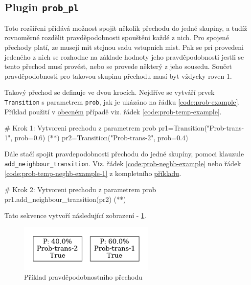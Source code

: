 \subsection{Plugin \texttt{prob\_pl}}
\label{subsec:prob_pl}
Toto rozšířeni přidává možnost spojit několik přechodu do jedné skupiny, a tudíž rovnoměrné rozdělit pravděpodobnosti spouštěni každé z nich. Pro spojené přechody platí, ze musejí mit stejnou sadu vstupních mist. Pak se pri provedeni jedeného z nich se rozhodne na základe hodnoty jeho pravděpodobnosti jestli se tento přechod musí provést, nebo se provede některý z jeho sousedu. Součet pravděpodobnosti pro takovou skupinu přechodu musí byt vždycky roven 1.

Takový přechod se definuje ve dvou krocích. Nejdříve se vytváří prvek \texttt{Transition} s parametrem \texttt{prob}, jak je ukázáno na řádku \ref{code:prob-example}. Příklad použití v \hyperref[code:prob-ev-draw]{obecném} případě viz. řádek \ref{code:prob-temp-example}.
\begin{python}
  # Krok 1: Vytvoreni prechodu z parametrem prob
  pr1=Transition("Prob-trans-1", prob=0.6) (*\label{code:prob-example}*)
  pr2=Transition("Prob-trans-2", prob=0.4)
\end{python}

Dále stačí spojit pravdepodobnosti přechodu do jedné skupíny, pomoci klauzule \\ \texttt{add\_neighbour\_transition}. Viz. řádek \ref{code:prob-neghb-example} nebo řádek \ref{code:prob-temp-neghb-example-1} z kompletního \hyperref[code:prob-ev-draw]{příkladu}.
\begin{python}
  # Krok 2: Vytvoreni prechodu z parametrem prob
  pr1.add_neighbour_transition(pr2) (*\label{code:prob-neghb-example}*)
\end{python}

Tato sekvence vytvoří následující zobrazení - \ref{prob-transition}.

\begin{figure}[hbt]
  \centering
  \includegraphics[width=0.6\textwidth]{obrazky-figures/prob-transition.png}
  \caption{Příklad pravděpodobnostního přechodu}
  \label{prob-transition}
\end{figure}

